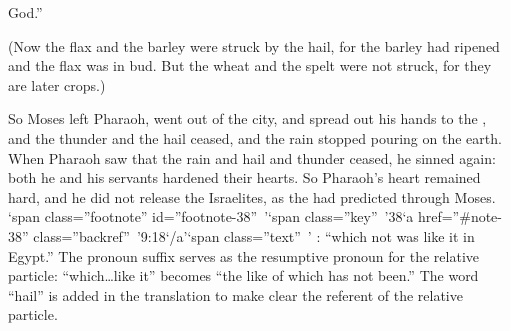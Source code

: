 {God.”
\par }{\PP {}(Now the flax
and the barley
were struck by the hail,
for
the barley
had ripened
and the flax
was in bud.
But the wheat
and the spelt
were not
struck,
for
they are later crops.)
\par }{\PP {}So Moses
left
Pharaoh,
went out of the
city,
and spread
out his hands
to
the {}, and the thunder
and the hail
ceased,
and the rain
stopped
pouring
on the earth.
When Pharaoh
saw
that
the rain
and hail
and thunder
ceased,
he sinned
again: both he and his servants
hardened
their hearts.
So Pharaoh’s
heart
remained hard, and he did not
release
the Israelites,
as the
{}
had
predicted
through
Moses. ‘span class=”footnote” id=”footnote-38” ’‘span class=”key” ’38‘a href=”\#note-38” class=”backref” ’9:18‘/a’‘span class=”text” ’
{}:
{} “which not was like it in Egypt.” The pronoun suffix serves as the resumptive pronoun for the relative particle: “which…like it” becomes “the like of which has not been.” The word “hail” is added in the translation to make clear the referent of the relative particle.

}
